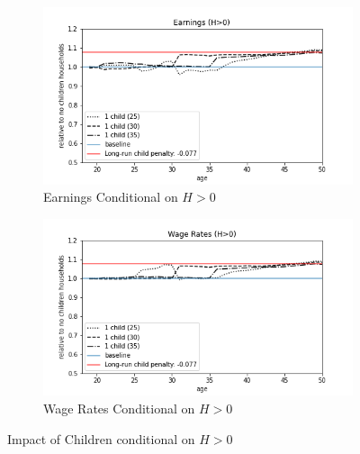 \begin{figure}[ht]
\begin{subfigure}{.5\textwidth}
  \centering
  \includegraphics[width=1\linewidth]{figures/extended_model_event_earnings_H>0.png}
  \caption{Earnings Conditional on $H > 0$}
  \label{fig:ext_model_event_earnings_alt}
\end{subfigure}%
\begin{subfigure}{.5\textwidth}
  \centering
  \includegraphics[width=1\linewidth]{figures/extended_model_event_wage_rates_H>0.png}
  \caption{Wage Rates Conditional on $H>0$}
  \label{fig:ext_model_event_wage_rates_alt}
\end{subfigure}
    \caption{Impact of Children conditional on $H>0$}
    \label{fig:ext_model_impact_alt}
\end{figure}

